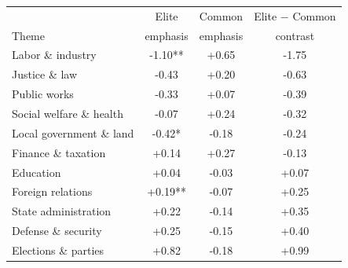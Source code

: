 \begin{tabular}{lccc}
\toprule
 & Elite & Common & Elite $-$ Common \\
Theme & emphasis & emphasis & contrast \\
\midrule
Labor \& industry & -1.10** & +0.65 & -1.75 \\
Justice \& law & -0.43 & +0.20 & -0.63 \\
Public works & -0.33 & +0.07 & -0.39 \\
Social welfare \& health & -0.07 & +0.24 & -0.32 \\
Local government \& land & -0.42* & -0.18 & -0.24 \\
Finance \& taxation & +0.14 & +0.27 & -0.13 \\
Education & +0.04 & -0.03 & +0.07 \\
Foreign relations & +0.19** & -0.07 & +0.25 \\
State administration & +0.22 & -0.14 & +0.35 \\
Defense \& security & +0.25 & -0.15 & +0.40 \\
Elections \& parties & +0.82 & -0.18 & +0.99 \\
\bottomrule
\end{tabular}
